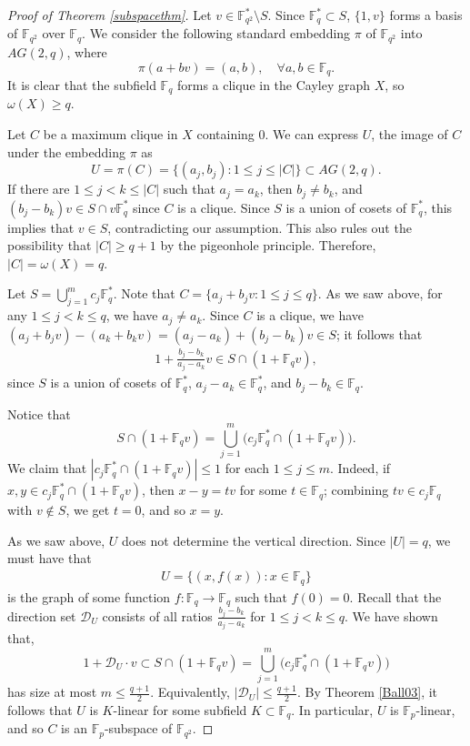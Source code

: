 \documentclass[12pt,reqno]{amsart}
\theoremstyle{definition}
\newcommand{\F}{\mathbb{F}}
\begin{document}
\begin{proof}[Proof of Theorem \ref{subspacethm}]
Let $v \in \F_{q^2}^* \setminus S$. Since $\F_q^* \subset S$, $\{1,v\}$ forms a basis of $\F_{q^2}$ over $\F_q$. We consider the following standard embedding $\pi$ of $\F_{q^2}$ into $AG(2,q)$, where 
\[
\pi(a+bv)=(a,b), \quad \forall a,b \in \F_q.
\]
It is clear that the subfield $\F_q$ forms a clique in the Cayley graph $X$, so $\omega(X)\geq q$. 

Let $C$ be a maximum clique in $X$ containing $0$. We can express $U$, the image of $C$ under the embedding $\pi$ as 
\[
U=\pi(C)=\{(a_j,b_j): 1 \leq j \leq |C|\} \subset AG(2,q).
\]
If there are $1 \leq j<k \leq |C|$ such that $a_j=a_k$, then $b_j \neq b_k$, and $(b_j-b_k)v \in S \cap v\F_q^*$ since $C$ is a clique. Since $S$ is a union of cosets of $\F_q^*$, this implies that $v \in S$, contradicting our assumption. This also rules out the possibility that $|C| \geq q+1$ by the pigeonhole principle. Therefore, $|C|=\omega(X)=q$. 

Let $S=\bigcup_{j=1}^{m} c_j \F_q^*$. Note that $C=\{a_j+b_jv: 1\leq j \leq q\}$. As we saw above, for any $1 \leq j<k \leq q$, we have $a_j \neq a_k$. Since $C$ is a clique, we have $(a_j+b_jv)-(a_k+b_kv)=(a_j-a_k)+(b_j-b_k)v \in S$; it follows that 
\begin{align*}
1+\frac{b_j-b_k}{a_j-a_k} v \in S \cap (1+\F_q v),
\end{align*}
since $S$ is a union of cosets of $\F_q^*$, $a_j-a_k \in \F_q^*$, and $b_j-b_k \in \F_q$.

Notice that 
\[
S \cap (1+\F_q v)= \bigcup_{j=1}^{m} \big(c_j \F_q^*\cap (1+\F_q v)\big).
\]
We claim that $|c_j \F_q^*\cap (1+\F_q v)| \leq 1$ for each $1 \leq j \leq m$. Indeed, if $x, y\in c_j \F_q^*\cap (1+\F_q v)$, then $x-y= t v$ for some $t \in \F_q$; combining $t v \in c_j \F_q$ with $v\notin S$, we get $t=0$, and so $x=y$.

As we saw above, $U$ does not determine the vertical direction. Since $|U|=q$, we must have that
\begin{align*}
U=\{(x,f(x)): x \in \F_q\}
\end{align*}
is the graph of some function $f:\F_q \to \F_q$ such that $f(0)=0$. Recall that the direction set $\mathcal{D}_U$ consists of all ratios $\frac{b_j-b_k}{a_j-a_k}$ for $1\leq j < k \leq q$. We have shown that, 
\[
1+\mathcal{D}_U \cdot v \subset  S \cap (1+\F_q v)= \bigcup_{j=1}^{m} \big(c_j \F_q^*\cap (1+\F_q v)\big) 
\]
has size at most $m \leq \frac{q+1}{2}$. Equivalently, $|\mathcal{D}_U|\leq \frac{q+1}{2}$. By Theorem \ref{Ball03}, it follows that $U$ is $K$-linear for some subfield $K\subset \F_q$. In particular, $U$ is $\F_p$-linear, and so $C$ is an $\F_p$-subspace of $\F_{q^2}$.
\end{proof}
\end{document}
